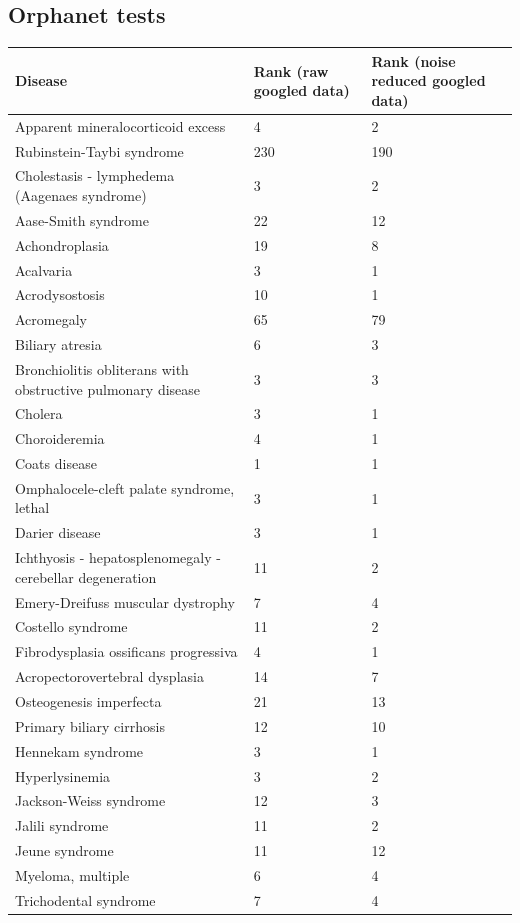 \documentclass[10pt,letterpaper,final]{article}
\begin{document}
\subsection{Orphanet tests}
\begin{center}
\begin{small}
	\begin{longtable}{|p{3.5cm}|p{1.8cm}|p{1.8cm}|}
	\hline
	\textbf{Disease}  & \textbf{Rank (raw googled data)} & \textbf{Rank (noise reduced googled data)} \\
    \hline\hline
    Apparent mineralocorticoid excess & 4 & 2\\    \hline
    Rubinstein-Taybi syndrome  & 230 & 190\\    \hline
    Cholestasis - lymphedema  (Aagenaes syndrome) & 3 & 2\\    \hline
    Aase-Smith syndrome  & 22 & 12\\    \hline
    Achondroplasia  & 19 & 8\\    \hline
    Acalvaria    & 3 & 1\\    \hline
    Acrodysostosis  & 10 & 1\\    \hline
    Acromegaly & 65 & 79\\    \hline
    Biliary atresia  & 6 & 3\\    \hline
    Bronchiolitis obliterans with obstructive pulmonary disease  & 3 & 3\\    \hline
    Cholera  & 3 & 1\\    \hline
    Choroideremia  & 4 & 1\\    \hline
    Coats disease  & 1 & 1\\    \hline
    Omphalocele-cleft palate syndrome, lethal  & 3 & 1\\    \hline
    Darier disease  & 3 & 1\\    \hline
    Ichthyosis - hepatosplenomegaly - cerebellar degeneration  & 11 & 2\\    \hline
    Emery-Dreifuss muscular dystrophy  & 7 & 4\\    \hline
    Costello syndrome  & 11 & 2\\    \hline
    Fibrodysplasia ossificans progressiva  & 4 & 1\\    \hline
    Acropectorovertebral dysplasia  & 14 & 7\\    \hline
    Osteogenesis imperfecta  & 21 & 13\\    \hline
    Primary biliary cirrhosis  & 12 & 10\\    \hline
    Hennekam syndrome  & 3 & 1\\    \hline
    Hyperlysinemia  & 3 & 2\\    \hline
    Jackson-Weiss syndrome  & 12 & 3\\    \hline
    Jalili syndrome & 11 & 2\\    \hline
    Jeune syndrome & 11 & 12\\    \hline
    Myeloma, multiple  & 6 & 4\\    \hline
    Trichodental syndrome  & 7 & 4\\    \hline
    \end{longtable}
    \label{tab:results_orphanet}
\end{small}
\end{center}
\end{document}

